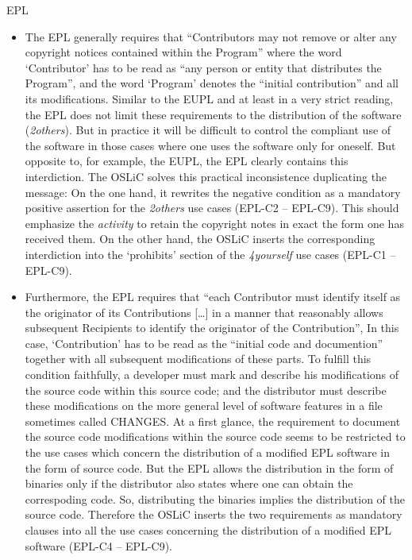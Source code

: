 \begin{license}{EPL}
\begin{itemize}
  \item The EPL generally requires that \enquote{Contributors may not remove or
    alter any copyright notices contained within the Program} where
    the word `Contributor' has to be read as \enquote{any person or entity that
    distributes the Program}, and the word `Program' denotes the
    \enquote{initial contribution} and all its modifications. 
    Similar to the EUPL and at least in a very strict reading, the EPL does not
    limit these requirements to the distribution of the software
    (\emph{2others}). But in practice it will be difficult to control the
    compliant use of the software in those cases where one uses the software
    only for oneself. But opposite to, for example, the EUPL, the EPL clearly
    contains this interdiction. The OSLiC solves this practical inconsistence
    duplicating the message: On the one hand, it rewrites the negative condition
    as a mandatory positive assertion for the \emph{2others} use cases (EPL-C2 --
    EPL-C9). This should emphasize the \emph{activity} to retain the copyright
    notes in exact the form one has received them. On the other hand, the OSLiC
    inserts the corresponding interdiction into the `prohibits' section of the
    \emph{4yourself} use cases (EPL-C1 -- EPL-C9).
  
  \item Furthermore, the EPL requires that \enquote{each Contributor must
    identify itself as the originator of its Contributions [\ldots] in a manner
    that reasonably allows subsequent Recipients to identify the originator of
    the Contribution}, In this case, `Contribution' has to be read
    as the \enquote{initial code and documention} together with all subsequent
    modifications of these parts. To fulfill this condition
    faithfully, a developer must mark and describe his modifications of the
    source code within this source code; and the distributor must describe these
    modifications on the more general level of software features in a file
    sometimes called CHANGES. At a first glance, the requirement to document the
    source code modifications within the source code seems to be restricted to
    the use cases which concern the distribution of a modified EPL software in
    the form of source code. But the EPL allows the distribution in the form of
    binaries only if the distributor also states where one can obtain the
    correspoding code. So, distributing the binaries implies the
    distribution of the source code.  Therefore the OSLiC inserts the two
    requirements as mandatory clauses into all the use cases concerning the
    distribution of a modified EPL software (EPL-C4 -- EPL-C9).
  

\end{itemize}
\end{license}
